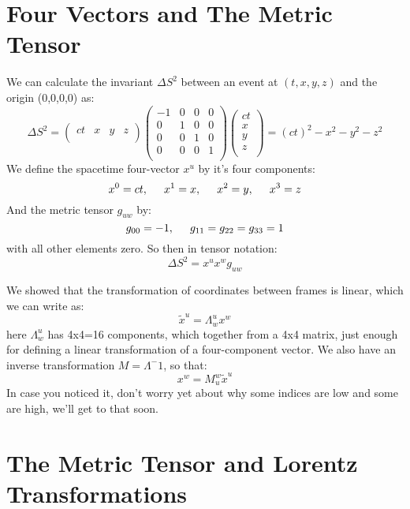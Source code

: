 \documentclass[12pt]{book}
\begin{document}
\section{Four Vectors and The Metric Tensor}

We can calculate the invariant $\Delta S^2$ between an event at $(t,x,y,z)$ and the origin (0,0,0,0) as:
$$
\Delta S^2 = 
\begin{pmatrix} 
ct & x & y & z \\ 
\end{pmatrix}
\begin{pmatrix} 
-1 & 0 & 0 & 0 \\ 
 0 & 1 & 0 & 0 \\ 
 0 & 0 & 1 & 0 \\ 
 0 & 0 & 0 & 1 \\ 
\end{pmatrix}
\begin{pmatrix} 
ct \\ 
x \\ 
y \\ 
z \\ 
\end{pmatrix}
=(ct)^2 - x^2 - y^2 - z^2
$$
We define the spacetime four-vector $x^u$ by it's four components:
$$x^0=ct, \hspace{0.5cm} x^1=x, \hspace{0.5cm} x^2=y, \hspace{0.5cm} x^3=z$$
And the metric tensor $g_{uw}$ by:
$$g_{00}=-1, \hspace{0.5cm} g_{11}=g_{22}=g_{33}=1$$
with all other elements zero.  So then in tensor notation:
$$\Delta S^2 = x^u x^w g_{uw}$$

We showed that the transformation of coordinates between frames is linear, which we can write as:
$$\widetilde{x}^u = \Lambda^u_w x^w$$
here $\Lambda^u_w$ has 4x4=16 components, which together from a 4x4 matrix, just enough for defining a linear transformation of a four-component vector.  We also have an inverse transformation $M = \Lambda^-1$, so that:
$$ x^w = M^w_u\widetilde{x}^u$$
In case you noticed it, don't worry yet about why some indices are low and some are high, we'll get to that soon.

\section{The Metric Tensor and Lorentz Transformations}
\end{document}
